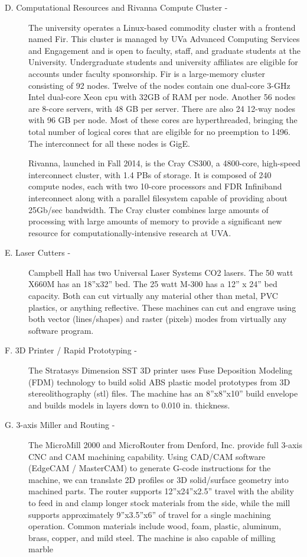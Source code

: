 \begin{description}
\item[D. Computational Resources and Rivanna Compute Cluster - ]

The university operates a Linux-based commodity cluster with a frontend named Fir. This cluster is managed by UVa Advanced Computing Services and Engagement and is open to faculty, staff, and graduate students at the University. Undergraduate students and university affiliates are eligible for accounts under faculty sponsorship. Fir is a large-memory cluster consisting of 92 nodes. Twelve of the nodes contain one dual-core 3-GHz Intel dual-core Xeon cpu with 32GB of RAM per node. Another 56 nodes are 8-core servers, with 48 GB per server.  There are also 24 12-way nodes with 96 GB per node.  Most of these cores are hyperthreaded, bringing the total number of logical cores that are eligible for no preemption to 1496. The interconnect for all these nodes is GigE. 

Rivanna, launched in Fall 2014, is the Cray CS300, a 4800-core, high-speed interconnect cluster, with 1.4 PBs of storage. It is composed of 240 compute nodes, each with two 10-core processors and FDR Inﬁniband interconnect along with a parallel ﬁlesystem capable of providing about 25Gb/sec bandwidth. The Cray cluster combines large amounts of processing with large amounts of memory to provide a signiﬁcant new resource for computationally-intensive research at UVA.

\item[E. Laser Cutters - ]

Campbell Hall has two Universal Laser Systems CO2 lasers. The 50 watt X660M has an 18”x32” bed. The 25 watt M-300 has a 12” x 24” bed capacity. Both can cut virtually any material other than metal, PVC plastics, or anything reflective. These machines can cut and engrave using both vector (lines/shapes) and raster (pixels) modes from virtually any software program.

\item[F. 3D Printer / Rapid Prototyping - ]

The Stratasys Dimension SST 3D printer uses Fuse Deposition Modeling (FDM) technology to build solid ABS plastic model prototypes from 3D stereolithography (stl) files. The machine has an 8”x8”x10” build envelope and builds models in layers down to 0.010 in. thickness.

\item[G. 3-axis Miller and Routing - ]

The MicroMill 2000 and MicroRouter from Denford, Inc. provide full 3-axis CNC and CAM machining capability. Using CAD/CAM software (EdgeCAM / MasterCAM) to generate G-code instructions for the machine, we can translate 2D profiles or 3D solid/surface geometry into machined parts. The router supports 12”x24”x2.5” travel with the ability to feed in and clamp longer stock materials from the side, while the mill supports approximately 9”x3.5”x6” of travel for a single machining operation. Common materials include wood, foam, plastic, aluminum, brass, copper, and mild steel. The machine is also capable of milling marble


\end{description}
